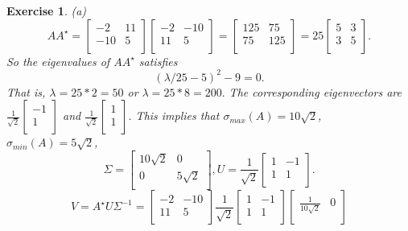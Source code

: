 \documentclass[paper=a4, fontsize=11pt]{scrartcl} %
\numberwithin{equation}{section} %
\numberwithin{figure}{section} %
\numberwithin{table}{section} %
\newtheorem{exercise}{Exercise}
\numberwithin{exercise}{section}
\begin{document}
\begin{exercise}
(a)
$$AA^{\star}=\begin{bmatrix}
- 2 & 11\\
-10 & 5 \\
\end{bmatrix}\begin{bmatrix}
- 2 & -10 \\
11 & 5 \\
\end{bmatrix}
=\begin{bmatrix}
125 & 75\\
75 & 125 \\
\end{bmatrix}=25\begin{bmatrix}
5 & 3\\
3 & 5 \\
\end{bmatrix}.$$
So the eigenvalues of $AA^{\star}$ satisfies 
$$(\lambda/25-5)^2-9=0.$$
That is, $\lambda=25*2=50$ or $\lambda=25*8=200.$ The corresponding eigenvectors are $\frac{1}{\sqrt{2}}  \begin{bmatrix}
-1 \\
1\\
\end{bmatrix}$ and $\frac{1}{\sqrt{2}}  \begin{bmatrix}
1 \\
1\\
\end{bmatrix}$.
This implies that $\sigma_{max} (A)=10\sqrt{2}$, $\sigma_{min} (A)=5\sqrt{2}$,
$$\Sigma=\begin{bmatrix}
10\sqrt{2} & 0 \\
0 & 5\sqrt{2}\\
\end{bmatrix},  U=\frac{1}{\sqrt{2}}\begin{bmatrix}
1 & -1 \\
1 & 1\\
\end{bmatrix}.$$
$$V=A^{\star} U\Sigma^{-1}=\begin{bmatrix}
-2 & -10 \\
11 & 5 \\
\end{bmatrix} \frac{1}{\sqrt{2}}\begin{bmatrix}
1 & -1 \\
1 & 1 \\
\end{bmatrix}\begin{bmatrix}
\frac{1}{10\sqrt{2}} & 0 \\

\end{bmatrix}$$
\end{exercise}
\end{document}
